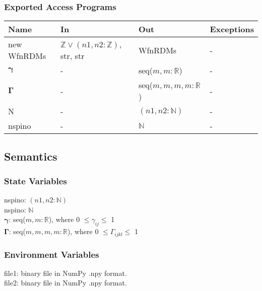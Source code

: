 \documentclass[12pt, titlepage]{article}
\begin{document}
\subsubsection{Exported Access Programs}

\begin{center}
	\begin{tabular}{p{3cm} p{4cm} p{4cm} p{2cm}}
		\hline
		\textbf{Name} & \textbf{In} & \textbf{Out} & \textbf{Exceptions} \\
		\hline
		new WfnRDMs& $\mathbb{Z} \lor (n1, n2:\mathbb{Z})$, str, 
		str& WfnRDMs& -\\
		$\boldsymbol{\gamma}$& -& seq($m,m:\mathbb{R}$)& -\\
		$\boldsymbol{\Gamma}$& -& seq($m,m,m,m:\mathbb{R}$)& -\\
		N & -& $(n1, n2:\mathbb{N})$& -\\
		nspino & -& $\mathbb{N}$& -\\
		\hline
	\end{tabular}
\end{center}

\subsection{Semantics}

\subsubsection{State Variables}

nspino: $(n1, n2:\mathbb{N})$\\
nspino: $\mathbb{N}$\\
$\boldsymbol{\gamma}$: seq($m,m:\mathbb{R}$), where 0 $\le \gamma_{ij} \le$ 1\\
$\boldsymbol{\Gamma}$: seq($m,m,m,m:\mathbb{R}$), where 0 $\le \Gamma_{ijkl} 
\le$ 1\\

\subsubsection{Environment Variables}

file1: binary file in NumPy .npy format.\\
file2: binary file in NumPy .npy format.
\end{document}
